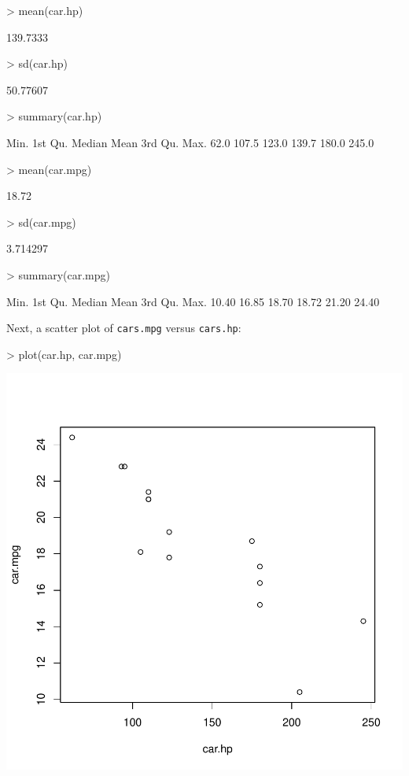 \begin{Schunk}
\begin{Sinput}
> mean(car.hp)
\end{Sinput}
\begin{Soutput}
[1] 139.7333
\end{Soutput}
\begin{Sinput}
> sd(car.hp)
\end{Sinput}
\begin{Soutput}
[1] 50.77607
\end{Soutput}
\begin{Sinput}
> summary(car.hp)
\end{Sinput}
\begin{Soutput}
   Min. 1st Qu.  Median    Mean 3rd Qu.    Max. 
   62.0   107.5   123.0   139.7   180.0   245.0 
\end{Soutput}
\begin{Sinput}
> mean(car.mpg)
\end{Sinput}
\begin{Soutput}
[1] 18.72
\end{Soutput}
\begin{Sinput}
> sd(car.mpg)
\end{Sinput}
\begin{Soutput}
[1] 3.714297
\end{Soutput}
\begin{Sinput}
> summary(car.mpg)
\end{Sinput}
\begin{Soutput}
   Min. 1st Qu.  Median    Mean 3rd Qu.    Max. 
  10.40   16.85   18.70   18.72   21.20   24.40 
\end{Soutput}
\end{Schunk}
Next, a scatter plot of \verb+cars.mpg+ versus \verb+cars.hp+:
\begin{Schunk}
\begin{Sinput}
> plot(car.hp, car.mpg)
\end{Sinput}
\end{Schunk}
\includegraphics{chapter2-005}
